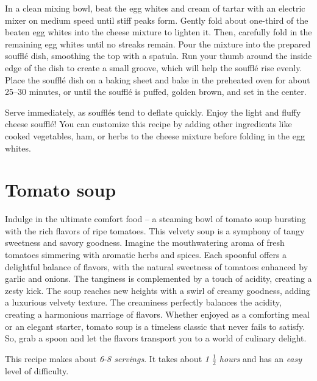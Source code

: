 In a clean mixing bowl, beat the egg whites and cream of tartar with an electric mixer on medium speed until stiff peaks form. Gently fold about one-third of the beaten egg whites into the cheese mixture to lighten it. Then, carefully fold in the remaining egg whites until no streaks remain. Pour the mixture into the prepared soufflé dish, smoothing the top with a spatula. Run your thumb around the inside edge of the dish to create a small groove, which will help the soufflé rise evenly. Place the soufflé dish on a baking sheet and bake in the preheated oven for about 25--30 minutes, or until the soufflé is puffed, golden brown, and set in the center.

Serve immediately, as soufflés tend to deflate quickly. Enjoy the light and fluffy cheese soufflé! You can customize this recipe by adding other ingredients like cooked vegetables, ham, or herbs to the cheese mixture before folding in the egg whites.

\section{Tomato soup}
\label{tomatosoup}
Indulge in the ultimate comfort food -- a steaming bowl of tomato soup bursting with the rich flavors of ripe tomatoes. This velvety soup is a symphony of tangy sweetness and savory goodness. Imagine the mouthwatering aroma of fresh tomatoes simmering with aromatic herbs and spices. Each spoonful offers a delightful balance of flavors, with the natural sweetness of tomatoes enhanced by garlic and onions. The tanginess is complemented by a touch of acidity, creating a zesty kick. The soup reaches new heights with a swirl of creamy goodness, adding a luxurious velvety texture. The creaminess perfectly balances the acidity, creating a harmonious marriage of flavors. Whether enjoyed as a comforting meal or an elegant starter, tomato soup is a timeless classic that never fails to satisfy. So, grab a spoon and let the flavors transport you to a world of culinary delight.

This recipe makes about \emph{6-8 servings}. It takes about \emph{1 $\frac{1}{2}$ hours} and has an \emph{easy} level of difficulty. 

